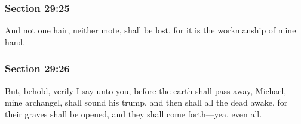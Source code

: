 
	\subsubsection{Section 29:25} %
		\label{DC29-25}

		And not one hair, neither mote, shall be lost, for it is the workmanship of mine hand.


	\subsubsection{Section 29:26} %
		\label{DC29-26}

		But, behold, verily I say unto you, before the earth shall pass away, Michael, mine archangel, shall sound his trump, and then shall all the dead awake, for their graves shall be opened, and they shall come forth---yea, even all.


